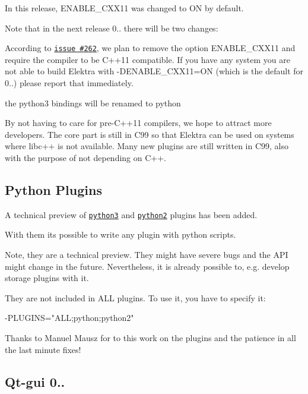 In this release, E\+N\+A\+B\+L\+E\+\_\+\+C\+X\+X11 was changed to {\ttfamily ON} by default.

Note that in the next release 0.. there will be two changes\+:


\begin{DoxyItemize}
\item According to \href{https://git.libelektra.org/issues/262}{\tt issue \#262}, we plan to remove the option E\+N\+A\+B\+L\+E\+\_\+\+C\+X\+X11 and require the compiler to be C++11 compatible. If you have any system you are not able to build Elektra with -\/\+D\+E\+N\+A\+B\+L\+E\+\_\+\+C\+X\+X11=ON (which is the default for 0..) please report that immediately.
\item the python3 bindings will be renamed to python
\end{DoxyItemize}

By not having to care for pre-\/\+C++11 compilers, we hope to attract more developers. The core part is still in C99 so that Elektra can be used on systems where libc++ is not available. Many new plugins are still written in C99, also with the purpose of not depending on C++.

\subsection*{Python Plugins}

A technical preview of \href{https://git.libelektra.org/blob/master/src/plugins/python}{\tt python3} and \href{https://git.libelektra.org/blob/master/src/plugins/python2}{\tt python2} plugins has been added.

With them its possible to write any plugin with python scripts.

Note, they are a technical preview. They might have severe bugs and the A\+PI might change in the future. Nevertheless, it is already possible to, e.\+g. develop storage plugins with it.

They are not included in {\ttfamily A\+LL} plugins. To use it, you have to specify it\+: \begin{DoxyVerb}-PLUGINS="ALL;python;python2"
\end{DoxyVerb}


Thanks to Manuel Mausz for to this work on the plugins and the patience in all the last minute fixes!

\subsection*{Qt-\/gui 0..}

